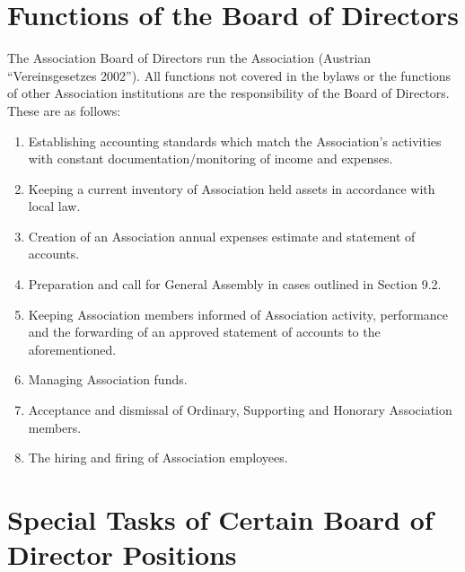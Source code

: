 \section{Functions of the Board of Directors}

The Association Board of Directors run the Association (Austrian “Vereinsgesetzes 2002”). All functions not covered in the bylaws or the functions of other Association institutions are the responsibility of the Board of Directors. These are as follows:

\begin{enumerate}
\item Establishing accounting standards which match the Association's activities with constant documentation/monitoring of income and expenses.
\item Keeping a current inventory of Association held assets in accordance with local law.
\item Creation of an Association annual expenses estimate and statement of accounts.
\item Preparation and call for General Assembly in cases outlined in Section 9.2.
\item Keeping Association members informed of Association activity, performance and the forwarding of an approved statement of accounts to the aforementioned.
\item Managing Association funds.
\item Acceptance and dismissal of Ordinary, Supporting and Honorary Association members.
\item The hiring and firing of Association employees.
\end{enumerate}

     


\section{Special Tasks of Certain Board of Director Positions}

